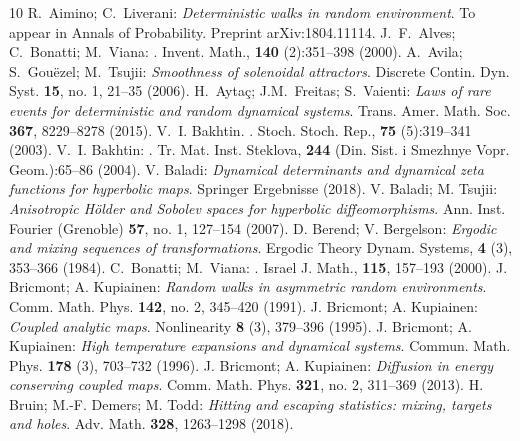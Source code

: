 
\begin{thebibliography}{10}
 R.\  Aimino; C.\ Liverani: {\em Deterministic walks in random environment}. To appear in Annals of Probability. Preprint arXiv:1804.11114.
J.~F.\  Alves; C.~Bonatti; M.~Viana:
.
\newblock  Invent. Math., {\bf 140} (2):351--398 (2000).
 A.\  Avila; S.\  Gou\"ezel; M.\  Tsujii: {\em Smoothness of solenoidal attractors}. Discrete Contin. Dyn. Syst. {\bf 15}, no. 1, 21--35 (2006).
 H.\  Ayta\c c; J.M.\  Freitas; S.\  Vaienti: {\em Laws of rare events for deterministic and random dynamical systems}. Trans. Amer. Math. Soc. {\bf 367},  8229--8278 (2015). 
 V.~I. Bakhtin.
.
\newblock Stoch. Stoch. Rep., {\bf 75} (5):319--341 (2003).
 V.~I. Bakhtin:
.
\newblock Tr. Mat. Inst. Steklova, {\bf 244} (Din. Sist. i Smezhnye Vopr.
  Geom.):65--86 (2004).
   V. Baladi: {\em Dynamical determinants and dynamical zeta functions for hyperbolic maps}. Springer Ergebnisse (2018).
 V. Baladi; M. Tsujii: {\em Anisotropic H\"older and Sobolev spaces for hyperbolic diffeomorphisms}. Ann. Inst. Fourier (Grenoble) {\bf 57}, no. 1, 127--154  (2007).
 D. Berend; V. Bergelson: {\em Ergodic and mixing sequences of transformations}. Ergodic Theory Dynam.
Systems, {\bf 4} (3), 353--366 (1984).
C.~Bonatti; M.~Viana:
.
\newblock Israel J. Math., {\bf 115}, 157--193 (2000).
 J. Bricmont; A. Kupiainen: {\em Random walks in asymmetric random environments}.
Comm. Math. Phys. {\bf 142}, no. 2, 345--420 (1991).
 J. Bricmont; A. Kupiainen: {\em Coupled analytic maps}. Nonlinearity {\bf 8} (3), 379--396 (1995).
 J. Bricmont; A. Kupiainen: {\em High temperature expansions and dynamical systems}. Commun. Math. Phys. {\bf 178} (3), 703--732 (1996). 
 J. Bricmont; A. Kupiainen: {\em Diffusion in energy conserving coupled maps}. Comm. Math. Phys. {\bf 321}, no. 2, 311--369 (2013). 
 H. Bruin; M.-F. Demers; M. Todd: {\em Hitting and escaping statistics: mixing, targets and holes}. Adv. Math. {\bf 328}, 1263--1298  (2018). 

\end{thebibliography}
